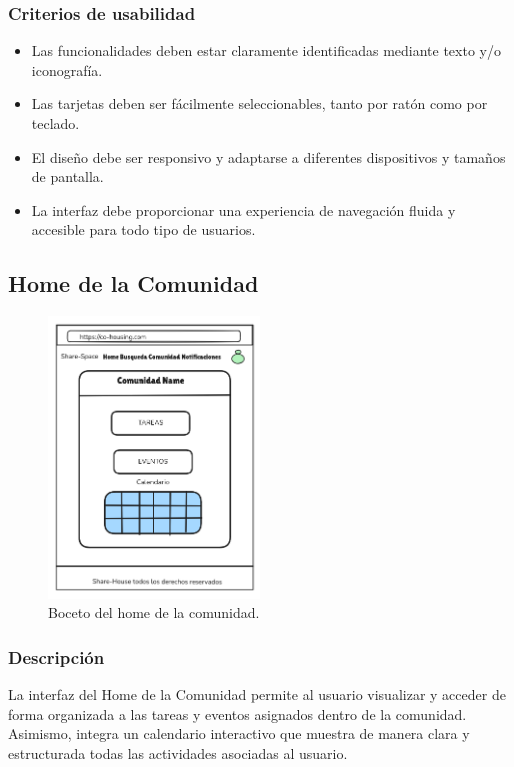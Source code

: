 \subsubsection{Criterios de usabilidad}
\begin{itemize}
  \item Las funcionalidades deben estar claramente identificadas mediante texto y/o iconografía.
  \item Las tarjetas deben ser fácilmente seleccionables, tanto por ratón como por teclado.
  \item El diseño debe ser responsivo y adaptarse a diferentes dispositivos y tamaños de pantalla.
  \item La interfaz debe proporcionar una experiencia de navegación fluida y accesible para todo tipo de usuarios.
\end{itemize}
\subsection{Home de la Comunidad}
\begin{figure}[H]
    \centering
    \includegraphics[width=0.5\textwidth]{fotos/tareas-boceto.png}
    \caption{Boceto del home de la comunidad.}
    \label{fig:tareas}
\end{figure}
\subsubsection{Descripción}
La interfaz del Home de la Comunidad permite al usuario visualizar y acceder de forma organizada a las tareas y eventos asignados dentro de la comunidad. Asimismo, integra un calendario interactivo que muestra de manera clara y estructurada todas las actividades asociadas al usuario.

